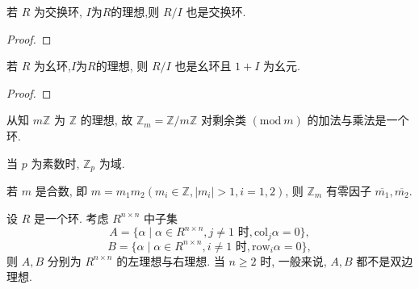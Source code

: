 \documentclass[../../main.tex]{subfiles}%
\begin{document}
\begin{corollary}\label{corollary:抽象代数-推论 1.4.1}
若 \( R \) 为交换环, $I$为$R$的理想,则 \( R/I \) 也是交换环.
\end{corollary}
\begin{proof}

\end{proof}

\begin{corollary}\label{corollary:抽象代数-推论 1.4.2}
若 \( R \) 为幺环,$I$为$R$的理想, 则 \( R/I \) 也是幺环且 \( 1 + I \) 为幺元.
\end{corollary}
\begin{proof}

\end{proof}

\begin{example}
从知 \( m\mathbb{Z} \) 为 \( \mathbb{Z} \) 的理想, 故 \( \mathbb{Z}_m = \mathbb{Z}/m\mathbb{Z} \) 对剩余类 \( (\text{mod}\ m) \) 的加法与乘法是一个环.

当 \( p \) 为素数时, \( \mathbb{Z}_p \) 为域.

若 \( m \) 是合数, 即 \( m = m_1m_2 (m_i \in \mathbb{Z}, |m_i| > 1, i = 1,2) \), 则 \( \mathbb{Z}_m \) 有零因子 \( \overline{m_1}, \overline{m_2} \).
\end{example}

\begin{example}
设 \( R \) 是一个环. 考虑 \( R^{n \times n} \) 中子集
\[
A = \{\alpha \mid \alpha \in R^{n \times n}, j \neq 1 \text{ 时}, \text{col}_j\alpha = 0\},
\]
\[
B = \{\alpha \mid \alpha \in R^{n \times n}, i \neq 1 \text{ 时}, \text{row}_i\alpha = 0\},
\]
则 \( A, B \) 分别为 \( R^{n \times n} \) 的左理想与右理想. 当 \( n \geqslant 2 \) 时, 一般来说, \( A, B \) 都不是双边理想.
\end{example}
\end{document}
